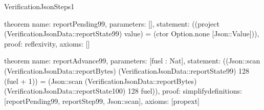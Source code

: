 \begin{lexlean}{VerificationJsonSteps1}
\begin{semanticmodule}
theorem{
  name: reportPending99,
  parameters: [],
  statement: ((project (VerificationJsonData::reportState99) value) = (ctor Option.none [Json::Value])),
  proof: reflexivity{},
  axioms: []
}

theorem{
  name: reportAdvance99,
  parameters: [fuel : Nat],
  statement: ((Json::scan (VerificationJsonData::reportBytes) (VerificationJsonData::reportState99) 128 (fuel + 1)) = (Json::scan (VerificationJsonData::reportBytes) (VerificationJsonData::reportState100) 128 fuel)),
  proof: simplify{definitions: [reportPending99, reportStep99, Json::scan]},
  axioms: [propext]
}

\end{semanticmodule}
\end{lexlean}
